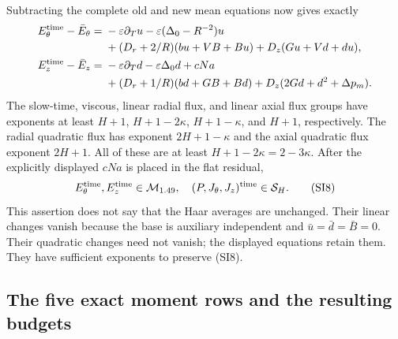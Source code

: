 \documentclass[10pt,a4paper]{article}
\begin{document}
Subtracting the complete old and new mean equations now gives exactly
\begin{align*}
E_\theta^{\rm time}-\bar E_\theta={}&-\varepsilon\partial_Tu
-\varepsilon(\Delta_0-R^{-2})u\\
&+(D_r+2/R)(bu+VB+Bu)+D_z(Gu+Vd+du),\\
E_z^{\rm time}-\bar E_z={}&-\varepsilon\partial_Td
-\varepsilon\Delta_0d+cNa\\
&+(D_r+1/R)(bd+GB+Bd)+D_z(2Gd+d^2+\Delta p_m).
\end{align*}
The slow-time, viscous, linear radial flux, and linear axial flux groups
have exponents at least $H+1$, $H+1-2\kappa$, $H+1-\kappa$,
and $H+1$, respectively.  The radial quadratic flux has exponent
$2H+1-\kappa$ and the axial quadratic flux exponent $2H+1$.
All of these are at least $H+1-2\kappa=2-3\kappa$.
After the explicitly displayed $cNa$ is placed in the flat residual,
\[
E_\theta^{\rm time},E_z^{\rm time}\in\mathcal M_{1.49},\quad
(P,J_\theta,J_z)^{\rm time}\in\mathcal S_H.
\tag{SI8}
\]
This assertion does not say that the Haar averages are unchanged.
Their linear changes vanish because the base is auxiliary independent and
$\bar u=\bar d=\bar B=0$.  Their quadratic changes need not vanish;
the displayed equations retain them.  They have sufficient exponents to
preserve (SI8).

\subsection{The five exact moment rows and the resulting budgets}
\end{document}
